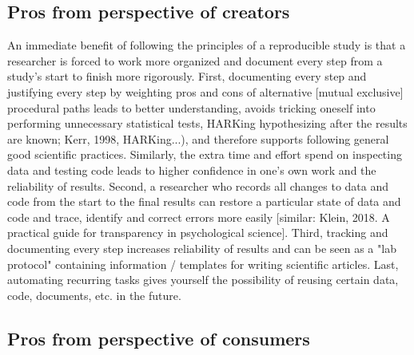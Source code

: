 \subsection{Pros from perspective of creators}

An immediate benefit of following the principles of a reproducible study is that
a researcher is forced to work more organized and document every step from a
study's start to finish more rigorously.
%
First, documenting every step and justifying every step by weighting pros and
cons of alternative [mutual exclusive] procedural paths leads to better
understanding, avoids tricking oneself into performing unnecessary statistical
tests, HARKing hypothesizing after the results are known; Kerr, 1998,
HARKing...), and therefore supports following general good scientific practices.
%
Similarly, the extra time and effort spend on inspecting data and testing code
leads to higher confidence in one's own work and the reliability of results.
%
Second, a researcher who records all changes to data and code from the start to
the final results can restore a particular state of data and code and trace,
identify and correct errors more easily [similar: Klein, 2018. A practical guide
for transparency in psychological science].
%
Third, tracking and documenting every step increases reliability of results and
can be seen as a "lab protocol" containing information / templates for writing
scientific articles.
%
Last, automating recurring tasks gives yourself the possibility of reusing
certain data, code, documents, etc. in the future.


\subsection{Pros from perspective of consumers}


